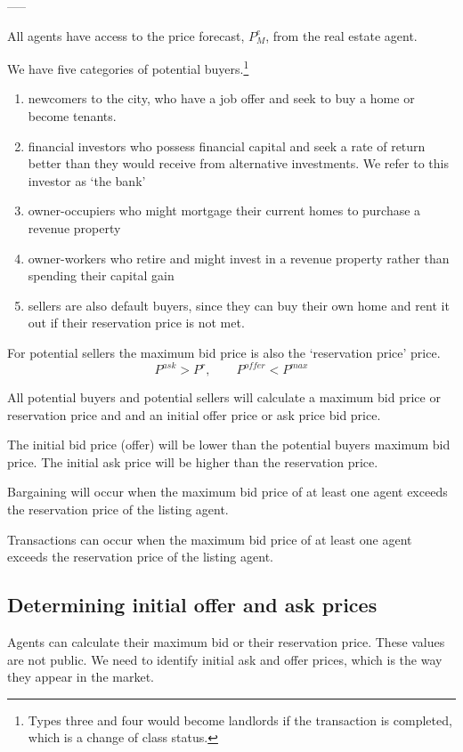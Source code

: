 -----

All agents have access to the price forecast, $P_M^e$, from the real estate agent.

We have five categories of potential buyers.\footnote{Types three and four  would  become landlords if the transaction is completed, which is a change of class status.} 
\begin{enumerate}
    \item newcomers to the city, who have a job offer  and seek to buy a home or become tenants.  
    \item financial investors who possess financial capital and seek a rate of return better than they would receive from alternative investments. We refer to this investor as `the bank'
    \item owner-occupiers who might mortgage their current homes  to purchase a revenue property
    \item owner-workers who retire and might  invest in a revenue property rather than spending  their capital gain 
    \item sellers are also default buyers, since they can buy their own home and rent it out if their \gls{reservation price} is not met.  
\end{enumerate}


For potential sellers the maximum bid price is also the `\gls{reservation price}' price.  
\[P^{ask}> P^r, \qquad   P^{offer}< P^{max}\]


All potential buyers and potential sellers  will calculate a \gls{maximum bid price} or reservation price and and an initial offer price or ask price \gls{bid  price}. 

The initial bid price (offer) will be lower than the potential buyers maximum bid price. The initial ask price will be higher than the reservation price.

Bargaining will occur when the maximum bid price of at least one agent exceeds the reservation price of the listing agent.

Transactions can occur when the maximum bid price of at least one agent exceeds the reservation price of the listing agent.


\subsection{Determining initial offer and ask prices}

Agents can calculate their maximum bid  or their  reservation price. 
These values are not public. We need to identify initial ask and offer prices, which is the way they appear in the market.


